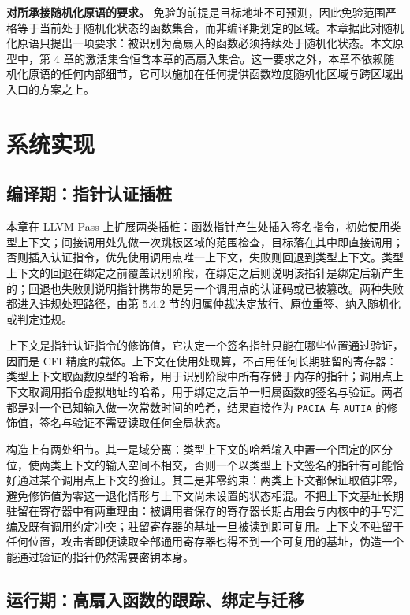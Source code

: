 \textbf{对所承接随机化原语的要求。} 免验的前提是目标地址不可预测，因此免验范围严格等于当前处于随机化状态的函数集合，而非编译期划定的区域。本章据此对随机化原语只提出一项要求：被识别为高扇入的函数必须持续处于随机化状态。本文原型中，第 4 章的激活集合恒含本章的高扇入集合。这一要求之外，本章不依赖随机化原语的任何内部细节，它可以施加在任何提供函数粒度随机化区域与跨区域出入口的方案之上。

\section{系统实现}

\subsection{编译期：指针认证插桩}

本章在 LLVM Pass 上扩展两类插桩：函数指针产生处插入签名指令，初始使用类型上下文；间接调用处先做一次跳板区域的范围检查，目标落在其中即直接调用；否则插入认证指令，优先使用调用点唯一上下文，失败则回退到类型上下文。类型上下文的回退在绑定之前覆盖识别阶段，在绑定之后则说明该指针是绑定后新产生的；回退也失败则说明指针携带的是另一个调用点的认证码或已被篡改。两种失败都进入违规处理路径，由第 5.4.2 节的归属仲裁决定放行、原位重签、纳入随机化或判定违规。

上下文是指针认证指令的修饰值，它决定一个签名指针只能在哪些位置通过验证，因而是 CFI 精度的载体。上下文在使用处现算，不占用任何长期驻留的寄存器：类型上下文取函数原型的哈希，用于识别阶段中所有存储于内存的指针；调用点上下文取调用指令虚拟地址的哈希，用于绑定之后单一归属函数的签名与验证。两者都是对一个已知输入做一次常数时间的哈希，结果直接作为 \lstinline[breaklines=false]@PACIA@ 与 \lstinline[breaklines=false]@AUTIA@ 的修饰值，签名与验证不需要读取任何全局状态。

构造上有两处细节。其一是域分离：类型上下文的哈希输入中置一个固定的区分位，使两类上下文的输入空间不相交，否则一个以类型上下文签名的指针有可能恰好通过某个调用点上下文的验证。其二是非零约束：两类上下文都保证取值非零，避免修饰值为零这一退化情形与上下文尚未设置的状态相混。不把上下文基址长期驻留在寄存器中有两重理由：被调用者保存的寄存器长期占用会与内核中的手写汇编及既有调用约定冲突；驻留寄存器的基址一旦被读到即可复用。上下文不驻留于任何位置，攻击者即便读取全部通用寄存器也得不到一个可复用的基址，伪造一个能通过验证的指针仍然需要密钥本身。

\subsection{运行期：高扇入函数的跟踪、绑定与迁移}

